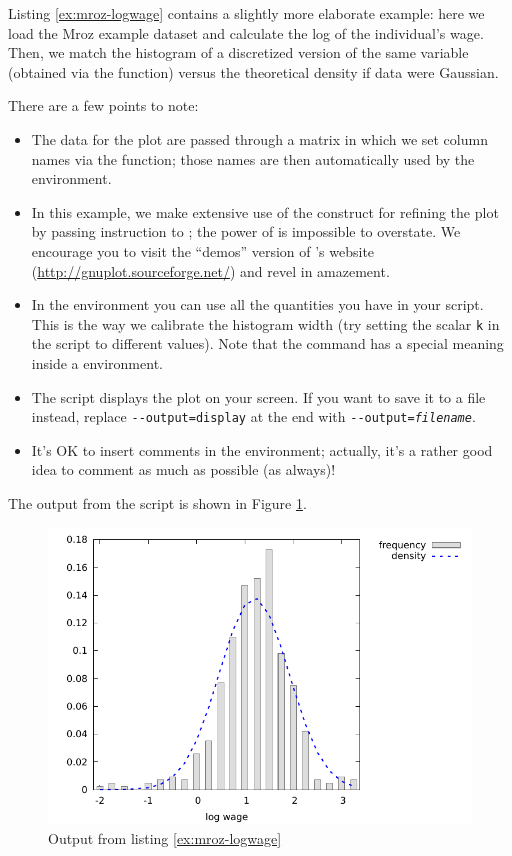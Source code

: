Listing \ref{ex:mroz-logwage} contains a slightly more elaborate
example: here we load the Mroz example dataset and calculate the log
of the individual's wage. Then, we match the histogram of a
discretized version of the same variable (obtained via the
 function) versus the theoretical density if data
were Gaussian.

There are a few points to note:
\begin{itemize}
\item The data for the plot are passed through a matrix in which we
  set column names via the  function; those names are
  then automatically used by the  environment.
\item In this example, we make extensive use of the 
  construct for refining the plot by passing instruction to
  ; the power of  is impossible to
  overstate. We encourage you to visit the ``demos'' version of
  's website (\url{http://gnuplot.sourceforge.net/}) and
  revel in amazement.
\item In the  environment you can use all the quantities you
  have in your script. This is the way we calibrate the histogram
  width (try setting the scalar \verb|k| in the script to different
  values). Note that the  command has a special meaning
  inside a  environment.
\item The script displays the plot on your screen. If you want to save
  it to a file instead, replace \verb!--output=display! at the end
  with \texttt{-{}-output=\textsl{filename}}.
\item It's OK to insert comments in the  environment;
  actually, it's a rather good idea to comment as much as possible (as
  always)!
\end{itemize}
The output from the script is shown in Figure \ref{fig:mroz-logwage}.


\begin{figure}[htbp]
  \centering
  \includegraphics{figures/Mroz-logwage}
  \caption{Output from listing \ref{ex:mroz-logwage}}
  \label{fig:mroz-logwage}
\end{figure}

